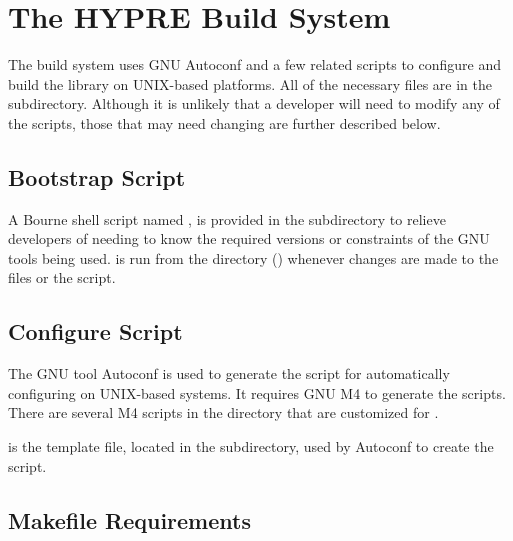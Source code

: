 
\chapter{The HYPRE Build System}
\label{The HYPRE Build System}


The \hypre{} build system uses GNU Autoconf and a few related scripts to 
configure and build the library on UNIX-based platforms.  All of the necessary files
are in the  subdirectory. Although it is unlikely that a developer 
will need to modify any of the scripts, those that may need changing are further
described below.

\section{Bootstrap Script}
\label{Bootstrap Script}

A Bourne shell script named , is provided in the  subdirectory
to relieve developers of needing to know the required versions or constraints of the GNU 
tools being used.   is run from the  directory 
() whenever changes are made to the  files or the 
 script.

\section{Configure Script}
\label{Configure Script}

The GNU tool Autoconf is used to generate the  script for automatically
configuring \hypre{} on UNIX-based systems.  It requires GNU M4 to generate the
scripts.  There are several M4 scripts in the  directory
that are customized for \hypre{}.

 is the template file, located in the  subdirectory, used 
by Autoconf to create the  script. 

\section{Makefile Requirements}
\label{Makefile Requirements}


